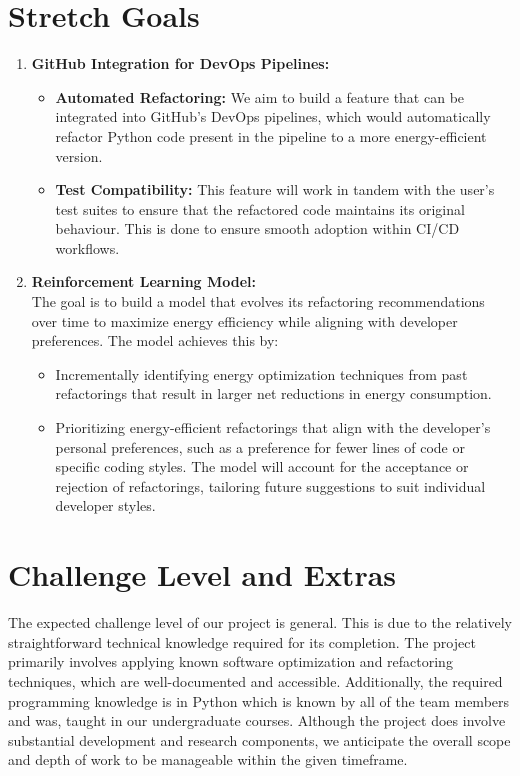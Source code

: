 \documentclass{article}
\begin{document}
\section{Stretch Goals}

\begin{enumerate}
    \item \textbf{GitHub Integration for DevOps Pipelines:}
    \begin{itemize}
        \item \textbf{Automated Refactoring:} We aim to build a feature that can be integrated into GitHub’s DevOps pipelines, which would automatically refactor Python code present in the pipeline to a more energy-efficient version.
        \item \textbf{Test Compatibility:} This feature will work in tandem with the user's test suites to ensure that the refactored code maintains its original behaviour. This is done to ensure smooth adoption within CI/CD workflows.
    \end{itemize}

    \item \textbf{Reinforcement Learning Model:} \\
    The goal is to build a model that evolves its refactoring recommendations over time to maximize energy efficiency while aligning with developer preferences. The model achieves this by:
    \begin{itemize}
        \item Incrementally identifying energy optimization techniques from past refactorings that result in larger net reductions in energy consumption.
        \item Prioritizing energy-efficient refactorings that align with the developer's personal preferences, such as a preference for fewer lines of code or specific coding styles. The model will account for the acceptance or rejection of refactorings, tailoring future suggestions to suit individual developer styles.
    \end{itemize}
\end{enumerate}


\section{Challenge Level and Extras}

The expected challenge level of our project is general. This is due to the
relatively straightforward technical knowledge required for its completion.
The project primarily involves applying known software optimization and
refactoring techniques, which are well-documented and accessible.
Additionally, the required programming knowledge is in Python which is known
by all of the team members and was, taught in our undergraduate courses.
Although the project does involve substantial development and research components,
we anticipate the overall scope and depth of work to be manageable within the
given timeframe. \\
\end{document}
